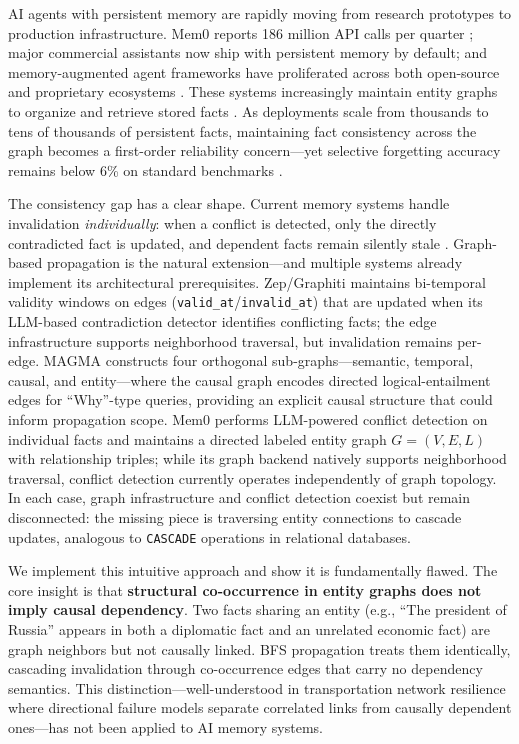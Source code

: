 \documentclass[11pt]{article}
\begin{document}
AI agents with persistent memory are rapidly moving from research prototypes to production infrastructure.
Mem0 reports 186 million API calls per quarter \citep{mem0_2024}; major commercial assistants now ship with persistent memory by default; and memory-augmented agent frameworks have proliferated across both open-source and proprietary ecosystems \citep{graph_agent_memory_survey_2026}.
These systems increasingly maintain entity graphs to organize and retrieve stored facts \citep{mem0_2024, magma_2026, zep_2025, graph_agent_memory_survey_2026}.
As deployments scale from thousands to tens of thousands of persistent facts, maintaining fact consistency across the graph becomes a first-order reliability concern---yet selective forgetting accuracy remains below 6\% on standard benchmarks \citep{memoryagentbench_2026}.

The consistency gap has a clear shape.
Current memory systems handle invalidation \textit{individually}: when a conflict is detected, only the directly contradicted fact is updated, and dependent facts remain silently stale \citep{mem0_2024, amem_2025}.
Graph-based propagation is the natural extension---and multiple systems already implement its architectural prerequisites.
Zep/Graphiti \citep{zep_2025} maintains bi-temporal validity windows on edges (\texttt{valid\_at}/\texttt{invalid\_at}) that are updated when its LLM-based contradiction detector identifies conflicting facts; the edge infrastructure supports neighborhood traversal, but invalidation remains per-edge.
MAGMA \citep{magma_2026} constructs four orthogonal sub-graphs---semantic, temporal, causal, and entity---where the causal graph encodes directed logical-entailment edges for ``Why''-type queries, providing an explicit causal structure that could inform propagation scope.
Mem0 \citep{mem0_2024} performs LLM-powered conflict detection on individual facts and maintains a directed labeled entity graph $G=(V,E,L)$ with relationship triples; while its graph backend natively supports neighborhood traversal, conflict detection currently operates independently of graph topology.
In each case, graph infrastructure and conflict detection coexist but remain disconnected: the missing piece is traversing entity connections to cascade updates, analogous to \texttt{CASCADE} operations in relational databases.

We implement this intuitive approach and show it is fundamentally flawed.
The core insight is that \textbf{structural co-occurrence in entity graphs does not imply causal dependency}.
Two facts sharing an entity (e.g., ``The president of Russia'' appears in both a diplomatic fact and an unrelated economic fact) are graph neighbors but not causally linked.
BFS propagation treats them identically, cascading invalidation through co-occurrence edges that carry no dependency semantics.
This distinction---well-understood in transportation network resilience \citep{chen_network_2007} where directional failure models separate correlated links from causally dependent ones---has not been applied to AI memory systems.
\end{document}
